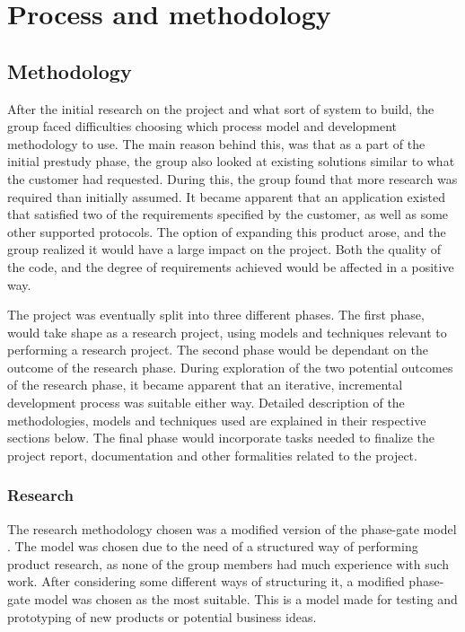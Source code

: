 
\chapter{Process and methodology}
\label{ch:process_and_methodology}

\section{Methodology}
\label{sec:process_and_methodology-process-methodology}

After the initial research on the project and what sort of system to build, the group faced difficulties choosing which process model and development methodology to use. The main reason behind this, was that as a part of the initial prestudy phase, the group also looked at existing solutions similar to what the customer had requested. During this, the group found that more research was required than initially assumed. It became apparent that an application existed that satisfied two of the requirements specified by the customer, as well as some other supported protocols. The option of expanding this product arose, and the group realized it would have a large impact on the project. Both the quality of the code, and the degree of requirements achieved would be affected in a positive way.

The project was eventually split into three different phases. The first phase, would take shape as a research project, using models and techniques relevant to performing a research project. The second phase would be dependant on the outcome of the research phase. During exploration of the two potential outcomes of the research phase, it became apparent that an iterative, incremental development process was suitable either way. Detailed description of the methodologies, models and techniques used are explained in their respective sections below. The final phase would incorporate tasks needed to finalize the project report, documentation and other formalities related to the project.

\subsection{Research}
\label{subsec:process_and_methodology-process-methodology-research}

The research methodology chosen was a modified version of the phase-gate model \cite{phase-gate-model}. The model was chosen due to the need of a structured way of performing product research, as none of the group members had much experience with such work. After considering some different ways of structuring it, a modified phase-gate model was chosen as the most suitable. This is a model made for testing and prototyping of new products or potential business ideas. 

